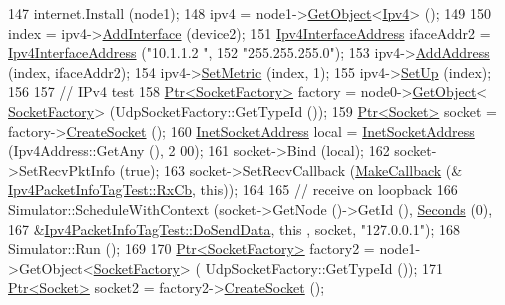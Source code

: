 \begin{DoxyCode}
147   internet.Install (node1);
148   ipv4 = node1->\hyperlink{classns3_1_1Object_a13e18c00017096c8381eb651d5bd0783}{GetObject}<\hyperlink{classns3_1_1Ipv4}{Ipv4}> ();
149 
150   index = ipv4->\hyperlink{classns3_1_1Ipv4_a637354128b71bc587ea5a6eeaef42469}{AddInterface} (device2);
151   \hyperlink{classns3_1_1Ipv4InterfaceAddress}{Ipv4InterfaceAddress} ifaceAddr2 = \hyperlink{classns3_1_1Ipv4InterfaceAddress}{Ipv4InterfaceAddress} (\textcolor{stringliteral}{"10.1.1.2
      "},
152                                                           \textcolor{stringliteral}{"255.255.255.0"});
153   ipv4->\hyperlink{classns3_1_1Ipv4_ad203526cae6a4b86f1bb89e44d2b62f7}{AddAddress} (index, ifaceAddr2);
154   ipv4->\hyperlink{classns3_1_1Ipv4_a2b5632573b67957fabe2dfea248a57a3}{SetMetric} (index, 1);
155   ipv4->\hyperlink{classns3_1_1Ipv4_a71b2f8acca4923aef907b50b3196bf23}{SetUp} (index);
156 
157   \textcolor{comment}{// IPv4 test}
158   \hyperlink{classns3_1_1Ptr}{Ptr<SocketFactory>} factory = node0->\hyperlink{classns3_1_1Object_a13e18c00017096c8381eb651d5bd0783}{GetObject}<
      \hyperlink{classns3_1_1SocketFactory}{SocketFactory}> (UdpSocketFactory::GetTypeId ());
159   \hyperlink{classns3_1_1Ptr}{Ptr<Socket>} socket = factory->\hyperlink{classns3_1_1SocketFactory_a97351e6e7860503a4912042530449f62}{CreateSocket} ();
160   \hyperlink{classns3_1_1InetSocketAddress}{InetSocketAddress} local =  \hyperlink{classns3_1_1InetSocketAddress}{InetSocketAddress} (Ipv4Address::GetAny (), 2
      00);
161   socket->Bind (local);
162   socket->SetRecvPktInfo (\textcolor{keyword}{true});
163   socket->SetRecvCallback (\hyperlink{group__makecallbackmemptr_ga9376283685aa99d204048d6a4b7610a4}{MakeCallback} (&
      \hyperlink{classIpv4PacketInfoTagTest_ac528deb0c346c973c2e5391540a53bc3}{Ipv4PacketInfoTagTest::RxCb}, \textcolor{keyword}{this}));
164 
165   \textcolor{comment}{// receive on loopback}
166   Simulator::ScheduleWithContext (socket->GetNode ()->GetId (), \hyperlink{group__timecivil_ga33c34b816f8ff6628e33d5c8e9713b9e}{Seconds} (0),
167                                   &\hyperlink{classIpv4PacketInfoTagTest_a5cba94d15d8c0921a95a3769c06221b7}{Ipv4PacketInfoTagTest::DoSendData}, \textcolor{keyword}{this}
      , socket, \textcolor{stringliteral}{"127.0.0.1"});
168   Simulator::Run ();
169 
170   \hyperlink{classns3_1_1Ptr}{Ptr<SocketFactory>} factory2 = node1->GetObject<\hyperlink{classns3_1_1SocketFactory}{SocketFactory}> (
      UdpSocketFactory::GetTypeId ());
171   \hyperlink{classns3_1_1Ptr}{Ptr<Socket>} socket2 = factory2->\hyperlink{classns3_1_1SocketFactory_a97351e6e7860503a4912042530449f62}{CreateSocket} ();

\end{DoxyCode}
